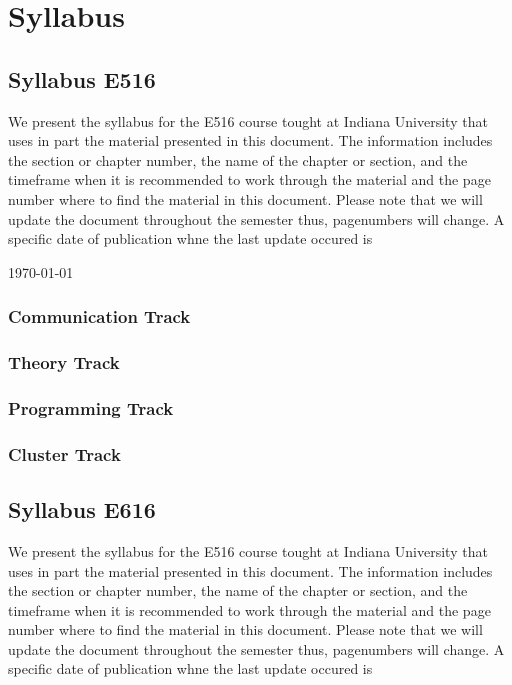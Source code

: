 \part{Syllabus}

\chapter{Syllabus E516}

We present the syllabus for the E516 course tought at Indiana
University that uses in part the material presented in this
document. The information includes the section or chapter number, the
name of the chapter or section, and the timeframe when it is
recommended to work through the material and the page number where to
find the material in this document. Please note that we will update
the document throughout the semester thus, pagenumbers will change. A
specific date of publication whne the last update occured is

\today~\currenttime 


\section{Communication Track}


\section{Theory Track}



\section{Programming Track}

\section{Cluster Track}

\chapter{Syllabus E616}

We present the syllabus for the E516 course tought at Indiana
University that uses in part the material presented in this
document. The information includes the section or chapter number, the
name of the chapter or section, and the timeframe when it is
recommended to work through the material and the page number where to
find the material in this document. Please note that we will update
the document throughout the semester thus, pagenumbers will change. A
specific date of publication whne the last update occured is

